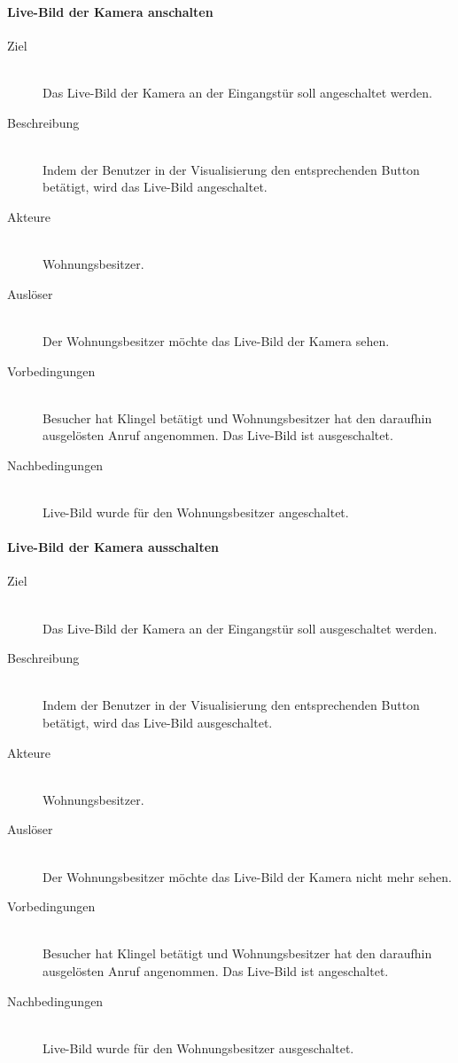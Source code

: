 \paragraph{Live-Bild der Kamera anschalten}
    \begin{description}
        \item[Ziel]\hfill \\
        Das Live-Bild der Kamera an der Eingangstür soll angeschaltet werden.
        \item[Beschreibung]\hfill \\
        Indem der Benutzer in der Visualisierung den entsprechenden Button betätigt, wird das Live-Bild angeschaltet.
        \item[Akteure]\hfill \\
        Wohnungsbesitzer.
        \item[Auslöser]\hfill \\
        Der Wohnungsbesitzer möchte das Live-Bild der Kamera sehen.
        \item[Vorbedingungen]\hfill \\
        Besucher hat Klingel betätigt und Wohnungsbesitzer hat den daraufhin ausgelösten Anruf angenommen.
        Das Live-Bild ist ausgeschaltet.
        \item[Nachbedingungen]\hfill \\
        Live-Bild wurde für den Wohnungsbesitzer angeschaltet.
        \end{description}

\paragraph{Live-Bild der Kamera ausschalten}
    \begin{description}
        \item[Ziel]\hfill \\
        Das Live-Bild der Kamera an der Eingangstür soll ausgeschaltet werden.
        \item[Beschreibung]\hfill \\
        Indem der Benutzer in der Visualisierung den entsprechenden Button betätigt, wird das Live-Bild ausgeschaltet.
        \item[Akteure]\hfill \\
        Wohnungsbesitzer.
        \item[Auslöser]\hfill \\
        Der Wohnungsbesitzer möchte das Live-Bild der Kamera nicht mehr sehen.
        \item[Vorbedingungen]\hfill \\
        Besucher hat Klingel betätigt und Wohnungsbesitzer hat den daraufhin ausgelösten Anruf angenommen.
        Das Live-Bild ist angeschaltet.
        \item[Nachbedingungen]\hfill \\
        Live-Bild wurde für den Wohnungsbesitzer ausgeschaltet.
        \end{description}

